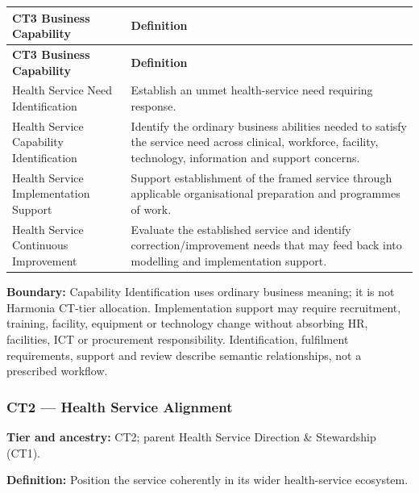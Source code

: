 \label{rad:business:880}
\begingroup\small\setlength{\TableWidth}{\dimexpr\linewidth-4\tabcolsep-3\arrayrulewidth\relax}
\begin{longtable}{|>{\raggedright\arraybackslash}p{0.35\TableWidth}|>{\raggedright\arraybackslash}p{0.65\TableWidth}|}
\hline\rowcolor{TableHead}\textbf{CT3 Business Capability} & \textbf{Definition}\\\hline\endfirsthead
\hline\rowcolor{TableHead}\textbf{CT3 Business Capability} & \textbf{Definition}\\\hline\endhead
\hline\endfoot
Health Service Need Identification & Establish an unmet health-service need requiring response.\\\hline
Health Service Capability Identification & Identify the ordinary business abilities needed to satisfy the service need across clinical, workforce, facility, technology, information and support concerns.\\\hline
Health Service Implementation Support & Support establishment of the framed service through applicable organisational preparation and programmes of work.\\\hline
Health Service Continuous Improvement & Evaluate the established service and identify correction/\allowbreak{}improvement needs that may feed back into modelling and implementation support.\\\hline
\end{longtable}\endgroup
{}\label{rad:business:887}

\textbf{Boundary:} Capability Identification uses ordinary business meaning; it is not Harmonia CT-tier allocation. Implementation support may require recruitment, training, facility, equipment or technology change without absorbing HR, facilities, ICT or procurement responsibility. Identification, fulfilment requirements, support and review describe semantic relationships, not a prescribed workflow.

\label{rad:business:889}
\subsubsection*{CT2 — Health Service Alignment}
\label{rad:business:891}

\textbf{Tier and ancestry:} CT2; parent Health Service Direction \& Stewardship (CT1).

\label{rad:business:893}

\textbf{Definition:} Position the service coherently in its wider health-service ecosystem.


